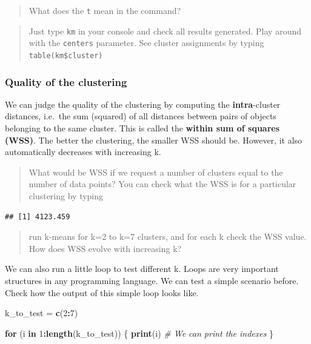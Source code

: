 \documentclass[
]{book}
\newenvironment{Shaded}{\begin{snugshade}}{\end{snugshade}}
\newcommand{\CommentTok}[1]{\textcolor[rgb]{0.56,0.35,0.01}{\textit{#1}}}
\newcommand{\ControlFlowTok}[1]{\textcolor[rgb]{0.13,0.29,0.53}{\textbf{#1}}}
\newcommand{\DecValTok}[1]{\textcolor[rgb]{0.00,0.00,0.81}{#1}}
\newcommand{\FunctionTok}[1]{\textcolor[rgb]{0.13,0.29,0.53}{\textbf{#1}}}
\newcommand{\NormalTok}[1]{#1}
\newcommand{\OtherTok}[1]{\textcolor[rgb]{0.56,0.35,0.01}{#1}}
\newcommand{\SpecialCharTok}[1]{\textcolor[rgb]{0.81,0.36,0.00}{\textbf{#1}}}
\begin{document}
\begin{quote}
What does the \texttt{t} mean in the command?
\end{quote}

\begin{quote}
Just type \texttt{km} in your console and check all results generated. Play around with the \texttt{centers} parameter. See cluster assignments by typing \texttt{table(km\$cluster)}
\end{quote}

\hypertarget{quality-of-the-clustering}{%
\subsubsection{Quality of the clustering}\label{quality-of-the-clustering}}

We can judge the quality of the clustering by computing the \textbf{intra}-cluster distances, i.e.~the sum (squared) of all distances between pairs of objects belonging to the same cluster. This is called the \textbf{within sum of squares (WSS)}. The better the clustering, the smaller WSS should be. However, it also automatically decreases with increasing k.

\begin{quote}
What would be WSS if we request a number of clusters equal to the number of data points? You can check what the WSS is for a particular clustering by typing
\end{quote}

\begin{Shaded}
\end{Shaded}

\begin{verbatim}
## [1] 4123.459
\end{verbatim}

\begin{quote}
run k-means for k=2 to k=7 clusters, and for each k check the WSS value. How does WSS evolve with increasing k?
\end{quote}

We can also run a little loop to test different k. Loops are very important structures in any programming language.
We can test a simple scenario before. Check how the output of this simple loop looks like.

\begin{Shaded}
\begin{Highlighting}[]
\NormalTok{k\_to\_test }\OtherTok{=} \FunctionTok{c}\NormalTok{(}\DecValTok{2}\SpecialCharTok{:}\DecValTok{7}\NormalTok{)}

\ControlFlowTok{for}\NormalTok{ (i }\ControlFlowTok{in} \DecValTok{1}\SpecialCharTok{:}\FunctionTok{length}\NormalTok{(k\_to\_test)) \{}
  \FunctionTok{print}\NormalTok{(i) }\CommentTok{\# We can print the indexes}
\NormalTok{\}}
\end{Highlighting}
\end{Shaded}
\end{document}
